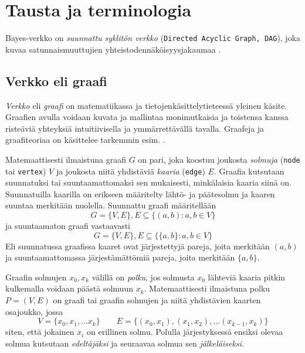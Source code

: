 \chapter{Tausta ja terminologia\label{background}}

Bayes-verkko on \emph{suunnattu syklitön verkko} (\texttt{Directed Acyclic Graph, DAG}), joka kuvaa satunnaismuuttujien yhteistodennäköisyysjakaumaa \citep{ruggeri_bayesian_2008}.

\section{Verkko eli graafi}
\emph{Verkko} eli \emph{graafi} on matematiikassa ja tietojenkäsittelytieteessä yleinen käsite. Graafien avulla voidaan  kuvata ja mallintaa monimutkaisia ja toistensa kanssa risteäviä yhteyksiä intuitiivisella ja ymmärrettävällä tavalla. Graafeja ja graafiteoriaa on käsittelee tarkemmin esim. \citet{diestel_graph_2017}.

\begin{center}
\centering
\begin{minipage}{.5\textwidth}
  \centering
\end{minipage}%
\begin{minipage}{.5\textwidth}
  \centering
\end{minipage}
\end{center}

Matemaattisesti ilmaistuna graafi $G$ on pari, joka koostuu joukosta \emph{solmuja} (\texttt{node} tai \texttt{vertex}) $V$ ja joukosta niitä yhdistäviä \emph{kaaria} (\texttt{edge}) $E$. Graafia kutsutaan suunnatuksi tai suuntaamattomaksi sen mukaisesti, minkälaisia kaaria siinä on. Suunnatuilla kaarilla on erikseen määritelty lähtö- ja päätesolmu ja kaaren suuntaa merkitään nuolella. Suunnattu graafi määritellään 
$$
    G = \{V, E\}, E \subseteq \{(a,b) : a,b \in V \}
$$
ja suuntaamaton graafi vastaavasti
$$
    G = \{V, E\}, E \subseteq \{\{a,b\} : a,b \in V \}
$$
Eli suunnatussa graafissa kaaret ovat järjestettyjä pareja, joita merkitään $(a,b)$ ja  suuntaamattomassa järjestämättömiä pareja, joita merkitään $\{a,b\}$.

Graafin solmujen $x_0, x_k$ välillä on \emph{polku}, jos solmusta $x_0$ lähteviä kaaria pitkin kulkemalla voidaan päästä solmuun $x_k$. Matemaattisesti ilmaistuna polku $P=(V,E)$ on graafi tai graafin solmujen ja niitä yhdistävien kaarten osajoukko, jossa 
$$
    V = \{x_0, x_1, \ldots x_k \} \qquad E = \{(x_0, x_1), (x_1,x_2),\ldots(x_{k-1}, x_k)\}
$$ 
siten, että jokainen $x_i$ on erillinen solmu. Polulla järjestyksessä ensiksi olevaa solmua kutsutaan \emph{edeltäjäksi} ja seuraavaa solmua sen \emph{jälkeläiseksi}.

